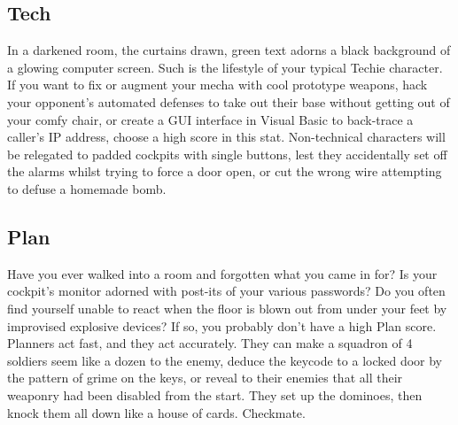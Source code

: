 \subsection{Tech}
In a darkened room, the curtains drawn, green text adorns a black background of a glowing computer screen. Such is the lifestyle of your typical Techie character. If you want to fix or augment your mecha with cool prototype weapons, hack your opponent's automated defenses to take out their base without getting out of your comfy chair, or create a GUI interface in Visual Basic to back-trace a caller's IP address, choose a high score in this stat. Non-technical characters will be relegated to padded cockpits with single buttons, lest they accidentally set off the alarms whilst trying to force a door open, or cut the wrong wire attempting to defuse a homemade bomb.

\subsection{Plan}
Have you ever walked into a room and forgotten what you came in for? Is your cockpit's monitor adorned with post-its of your various passwords? Do you often find yourself unable to react when the floor is blown out from under your feet by improvised explosive devices? If so, you probably don't have a high Plan score. Planners act fast, and they act accurately. They can make a squadron of 4 soldiers seem like a dozen to the enemy, deduce the keycode to a locked door by the pattern of grime on the keys, or reveal to their enemies that all their weaponry had been disabled from the start. They set up the dominoes, then knock them all down like a house of cards. Checkmate.
